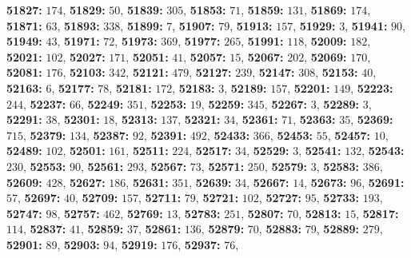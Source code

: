 \textsf{\bfseries 51827:} $174$, \textsf{\bfseries 51829:} $50$, \textsf{\bfseries 51839:} $305$, \textsf{\bfseries 51853:} $71$, \textsf{\bfseries 51859:} $131$, \textsf{\bfseries 51869:} $174$, \textsf{\bfseries 51871:} $63$, \textsf{\bfseries 51893:} $338$, \textsf{\bfseries 51899:} $7$, \textsf{\bfseries 51907:} $79$, \textsf{\bfseries 51913:} $157$, \textsf{\bfseries 51929:} $3$, \textsf{\bfseries 51941:} $90$, \textsf{\bfseries 51949:} $43$, \textsf{\bfseries 51971:} $72$, \textsf{\bfseries 51973:} $369$, \textsf{\bfseries 51977:} $265$, \textsf{\bfseries 51991:} $118$, \textsf{\bfseries 52009:} $182$, \textsf{\bfseries 52021:} $102$, \textsf{\bfseries 52027:} $171$, \textsf{\bfseries 52051:} $41$, \textsf{\bfseries 52057:} $15$, \textsf{\bfseries 52067:} $202$, \textsf{\bfseries 52069:} $170$, \textsf{\bfseries 52081:} $176$, \textsf{\bfseries 52103:} $342$, \textsf{\bfseries 52121:} $479$, \textsf{\bfseries 52127:} $239$, \textsf{\bfseries 52147:} $308$, \textsf{\bfseries 52153:} $40$, \textsf{\bfseries 52163:} $6$, \textsf{\bfseries 52177:} $78$, \textsf{\bfseries 52181:} $172$, \textsf{\bfseries 52183:} $3$, \textsf{\bfseries 52189:} $157$, \textsf{\bfseries 52201:} $149$, \textsf{\bfseries 52223:} $244$, \textsf{\bfseries 52237:} $66$, \textsf{\bfseries 52249:} $351$, \textsf{\bfseries 52253:} $19$, \textsf{\bfseries 52259:} $345$, \textsf{\bfseries 52267:} $3$, \textsf{\bfseries 52289:} $3$, \textsf{\bfseries 52291:} $38$, \textsf{\bfseries 52301:} $18$, \textsf{\bfseries 52313:} $137$, \textsf{\bfseries 52321:} $34$, \textsf{\bfseries 52361:} $71$, \textsf{\bfseries 52363:} $35$, \textsf{\bfseries 52369:} $715$, \textsf{\bfseries 52379:} $134$, \textsf{\bfseries 52387:} $92$, \textsf{\bfseries 52391:} $492$, \textsf{\bfseries 52433:} $366$, \textsf{\bfseries 52453:} $55$, \textsf{\bfseries 52457:} $10$, \textsf{\bfseries 52489:} $102$, \textsf{\bfseries 52501:} $161$, \textsf{\bfseries 52511:} $224$, \textsf{\bfseries 52517:} $34$, \textsf{\bfseries 52529:} $3$, \textsf{\bfseries 52541:} $132$, \textsf{\bfseries 52543:} $230$, \textsf{\bfseries 52553:} $90$, \textsf{\bfseries 52561:} $293$, \textsf{\bfseries 52567:} $73$, \textsf{\bfseries 52571:} $250$, \textsf{\bfseries 52579:} $3$, \textsf{\bfseries 52583:} $386$, \textsf{\bfseries 52609:} $428$, \textsf{\bfseries 52627:} $186$, \textsf{\bfseries 52631:} $351$, \textsf{\bfseries 52639:} $34$, \textsf{\bfseries 52667:} $14$, \textsf{\bfseries 52673:} $96$, \textsf{\bfseries 52691:} $57$, \textsf{\bfseries 52697:} $40$, \textsf{\bfseries 52709:} $157$, \textsf{\bfseries 52711:} $79$, \textsf{\bfseries 52721:} $102$, \textsf{\bfseries 52727:} $95$, \textsf{\bfseries 52733:} $193$, \textsf{\bfseries 52747:} $98$, \textsf{\bfseries 52757:} $462$, \textsf{\bfseries 52769:} $13$, \textsf{\bfseries 52783:} $251$, \textsf{\bfseries 52807:} $70$, \textsf{\bfseries 52813:} $15$, \textsf{\bfseries 52817:} $114$, \textsf{\bfseries 52837:} $41$, \textsf{\bfseries 52859:} $37$, \textsf{\bfseries 52861:} $136$, \textsf{\bfseries 52879:} $70$, \textsf{\bfseries 52883:} $79$, \textsf{\bfseries 52889:} $279$, \textsf{\bfseries 52901:} $89$, \textsf{\bfseries 52903:} $94$, \textsf{\bfseries 52919:} $176$, \textsf{\bfseries 52937:} $76$, 
